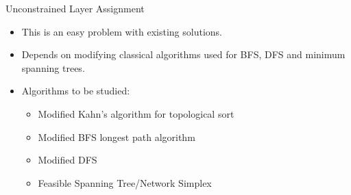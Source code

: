 \documentclass{beamer}
\begin{document}
\begin{frame}{Unconstrained Layer Assignment}
    
    \begin{itemize}
        
        \item This is an easy problem with existing solutions.
        \item Depends on modifying classical algorithms used for BFS, DFS and minimum spanning trees.
        \item Algorithms to be studied:

            \begin{itemize}
                
                \item Modified Kahn's algorithm for topological sort
                \item Modified BFS longest path algorithm
                \item Modified DFS
                \item Feasible Spanning Tree/Network Simplex

            \end{itemize}


    \end{itemize}

\end{frame}
\end{document}
